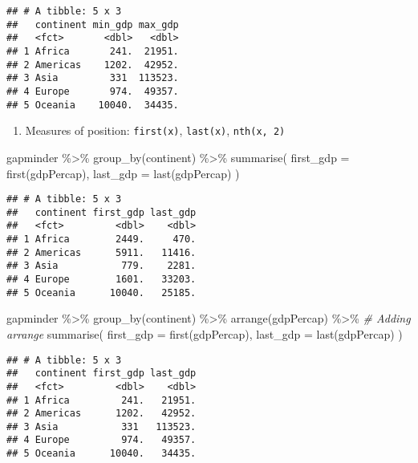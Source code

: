 \documentclass[
]{book}
\newenvironment{Shaded}{\begin{snugshade}}{\end{snugshade}}
\newcommand{\AttributeTok}[1]{\textcolor[rgb]{0.77,0.63,0.00}{#1}}
\newcommand{\CommentTok}[1]{\textcolor[rgb]{0.56,0.35,0.01}{\textit{#1}}}
\newcommand{\FunctionTok}[1]{\textcolor[rgb]{0.00,0.00,0.00}{#1}}
\newcommand{\NormalTok}[1]{#1}
\newcommand{\SpecialCharTok}[1]{\textcolor[rgb]{0.00,0.00,0.00}{#1}}
\providecommand{\tightlist}{%
  \setlength{\itemsep}{0pt}\setlength{\parskip}{0pt}}
\begin{document}
\begin{verbatim}
## # A tibble: 5 x 3
##   continent min_gdp max_gdp
##   <fct>       <dbl>   <dbl>
## 1 Africa       241.  21951.
## 2 Americas    1202.  42952.
## 3 Asia         331  113523.
## 4 Europe       974.  49357.
## 5 Oceania    10040.  34435.
\end{verbatim}

\begin{enumerate}
\def\labelenumi{\arabic{enumi}.}
\setcounter{enumi}{2}
\tightlist
\item
  Measures of position: \texttt{first(x)}, \texttt{last(x)}, \texttt{nth(x,\ 2)}
\end{enumerate}

\begin{Shaded}
\begin{Highlighting}[]
\NormalTok{gapminder }\SpecialCharTok{\%\textgreater{}\%}
  \FunctionTok{group\_by}\NormalTok{(continent) }\SpecialCharTok{\%\textgreater{}\%}
  \FunctionTok{summarise}\NormalTok{(}
    \AttributeTok{first\_gdp =} \FunctionTok{first}\NormalTok{(gdpPercap),}
    \AttributeTok{last\_gdp =} \FunctionTok{last}\NormalTok{(gdpPercap)}
\NormalTok{  )}
\end{Highlighting}
\end{Shaded}

\begin{verbatim}
## # A tibble: 5 x 3
##   continent first_gdp last_gdp
##   <fct>         <dbl>    <dbl>
## 1 Africa        2449.     470.
## 2 Americas      5911.   11416.
## 3 Asia           779.    2281.
## 4 Europe        1601.   33203.
## 5 Oceania      10040.   25185.
\end{verbatim}

\begin{Shaded}
\begin{Highlighting}[]
\NormalTok{gapminder }\SpecialCharTok{\%\textgreater{}\%}
  \FunctionTok{group\_by}\NormalTok{(continent) }\SpecialCharTok{\%\textgreater{}\%}
  \FunctionTok{arrange}\NormalTok{(gdpPercap) }\SpecialCharTok{\%\textgreater{}\%} \CommentTok{\# Adding arrange}
  \FunctionTok{summarise}\NormalTok{(}
    \AttributeTok{first\_gdp =} \FunctionTok{first}\NormalTok{(gdpPercap),}
    \AttributeTok{last\_gdp =} \FunctionTok{last}\NormalTok{(gdpPercap)}
\NormalTok{  )}
\end{Highlighting}
\end{Shaded}

\begin{verbatim}
## # A tibble: 5 x 3
##   continent first_gdp last_gdp
##   <fct>         <dbl>    <dbl>
## 1 Africa         241.   21951.
## 2 Americas      1202.   42952.
## 3 Asia           331   113523.
## 4 Europe         974.   49357.
## 5 Oceania      10040.   34435.
\end{verbatim}
\end{document}
